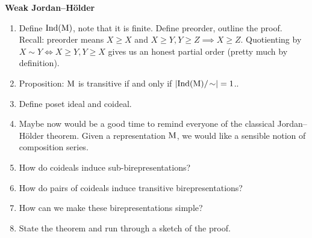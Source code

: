\noindent\textbf{Weak Jordan--H\"{o}lder}
\begin{enumerate}[label=$\bullet$, leftmargin=1\parindent]
\item Define $\textnormal{Ind}(\textnormal{M})$, note that it is finite. Define preorder, outline the proof. Recall: preorder means $X \geq X$ and $X \geq Y, Y \geq Z \implies X \geq Z$. Quotienting by $X \sim Y \iff X \geq Y, Y \geq X$ gives us an honest partial order (pretty much by definition).
\item Proposition: $\textnormal{M}$ is transitive if and only if $\lvert\textnormal{Ind}(\textnormal{M})/\!\sim\rvert = 1$..
\item Define poset ideal and coideal.
\item Maybe now would be a good time to remind everyone of the classical Jordan--H\"{o}lder theorem. Given a representation $\textnormal{M}$, we would like a sensible notion of composition series.
\item How do coideals induce sub-birepresentations?
\item How do pairs of coideals induce transitive birepresentations?
\item How can we make these birepresentations simple?
\item State the theorem and run through a sketch of the proof.
\end{enumerate}
\newpage

